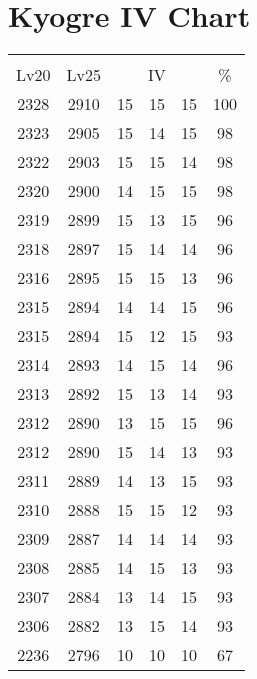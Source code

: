 \documentclass{article}%
\begin{document}
%
\normalsize%
\section{Kyogre IV Chart}%
\label{sec:Kyogre IV Chart}%
\renewcommand{\arraystretch}{1.5}%
\begin{tabular}{|c|c|c|c|c|c|}%
\hline%
\multicolumn{6}{|c|}{\textcolor{white}{ 
\linebreak{Kyogre}
}%
\cellcolor{black}}\\%
\multicolumn{1}{|c}{Lv20}&\multicolumn{1}{c|}{Lv25}&\multicolumn{3}{c|}{IV}&\multicolumn{1}{|c|}{\%}\\%
\hline%
\rowcolor{color100}%
2328&2910&15&15&15&100\\%
\hline%
\rowcolor{color98}%
2323&2905&15&14&15&98\\%
\hline%
\rowcolor{color98}%
2322&2903&15&15&14&98\\%
\hline%
\rowcolor{color98}%
2320&2900&14&15&15&98\\%
\hline%
\rowcolor{color96}%
2319&2899&15&13&15&96\\%
\hline%
\rowcolor{color96}%
2318&2897&15&14&14&96\\%
\hline%
\rowcolor{color96}%
2316&2895&15&15&13&96\\%
\hline%
\rowcolor{color96}%
2315&2894&14&14&15&96\\%
\hline%
\rowcolor{color93}%
2315&2894&15&12&15&93\\%
\hline%
\rowcolor{color96}%
2314&2893&14&15&14&96\\%
\hline%
\rowcolor{color93}%
2313&2892&15&13&14&93\\%
\hline%
\rowcolor{color96}%
2312&2890&13&15&15&96\\%
\hline%
\rowcolor{color93}%
2312&2890&15&14&13&93\\%
\hline%
\rowcolor{color93}%
2311&2889&14&13&15&93\\%
\hline%
\rowcolor{color93}%
2310&2888&15&15&12&93\\%
\hline%
\rowcolor{color93}%
2309&2887&14&14&14&93\\%
\hline%
\rowcolor{color93}%
2308&2885&14&15&13&93\\%
\hline%
\rowcolor{color93}%
2307&2884&13&14&15&93\\%
\hline%
\rowcolor{color93}%
2306&2882&13&15&14&93\\%
\hline%
\rowcolor{color91}%
2236&2796&10&10&10&67\\%
\end{tabular}

%
\end{document}
